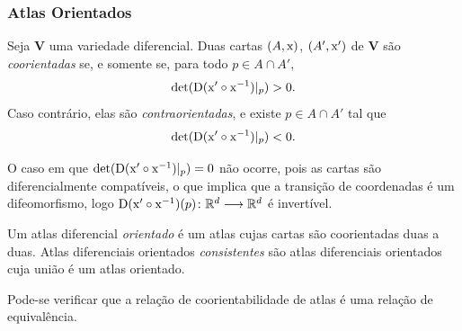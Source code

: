 \subsubsection{Atlas Orientados}

\begin{defi}
Seja $\bm V$ uma variedade diferencial. Duas cartas $(A,\mathrm{x})$, $(A',\mathrm{x}')$ de $\bm V$ são \emph{coorientadas} se, e somente se, para todo $p \in A \cap A'$,
	\begin{equation*}
	\det(\mathrm{D}(\mathrm{x}' \circ \mathrm{x}^{-1})|_p) > 0.
	\end{equation*}
Caso contrário, elas são \emph{contraorientadas}, e existe $p \in A \cap A'$ tal que
	\begin{equation*}
	\det(\mathrm{D}(\mathrm{x}' \circ \mathrm{x}^{-1})|_p) < 0.
	\end{equation*}
\end{defi}

O caso em que $\det(\mathrm{D}(\mathrm{x}' \circ \mathrm{x}^{-1})|_p) = 0$ não ocorre, pois as cartas são diferencialmente compatíveis, o que implica que a transição de coordenadas é um difeomorfismo, logo $\mathrm{D}(\mathrm{x}' \circ \mathrm{x}^{-1})(p)\colon \mathbb{R}^d \longrightarrow \mathbb{R}^d$ é invertível.

\begin{defi}
Um atlas diferencial \emph{orientado} é um atlas cujas cartas são coorientadas duas a duas. Atlas diferenciais orientados \emph{consistentes} são atlas diferenciais orientados cuja união é um atlas orientado.
\end{defi}

Pode-se verificar que a relação de coorientabilidade de atlas é uma relação de equivalência.









